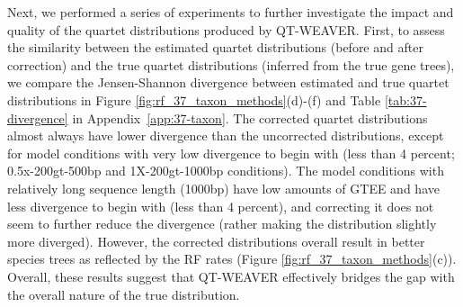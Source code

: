 \documentclass[runningheads]{llncs}
\newcommand{\addb}[1]{{\color{red} #1}}
\begin{document}
\vspace{-1pt}

Next, we performed a series of experiments to further investigate the impact and quality of the quartet distributions produced by QT-WEAVER. First, to assess the similarity between the estimated quartet distributions (before and after correction) and the true quartet distributions (inferred from the true gene trees), we compare the Jensen-Shannon divergence between estimated and true quartet distributions in Figure \ref{fig:rf_37_taxon_methods}(d)-(f) and Table \ref{tab:37-divergence} in Appendix~\ref{app:37-taxon}. The corrected quartet distributions almost always have lower divergence than the uncorrected distributions, except for model conditions with very low divergence to begin with (less than 4 percent; 0.5x-200gt-500bp and 1X-200gt-1000bp conditions). The model conditions with relatively long sequence length (1000bp) have low amounts of GTEE and have less divergence to begin with (less than 4 percent), and correcting it does not seem to further reduce the divergence (rather making the distribution slightly more diverged). However, the corrected distributions overall result in better species trees as reflected by the RF rates (Figure \ref{fig:rf_37_taxon_methods}(c)). %
Overall, these results suggest that QT-WEAVER effectively bridges the gap with the overall nature of the true distribution.

\vspace{-1pt}
\end{document}

